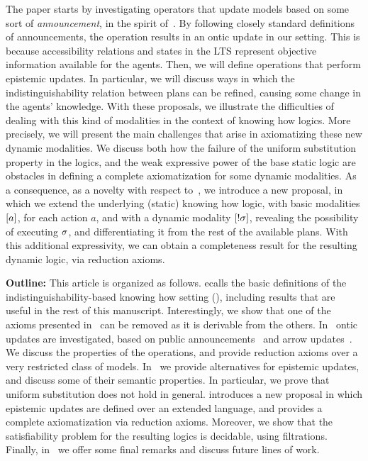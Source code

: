 The paper starts by investigating operators that update models based on some sort of \emph{announcement}, in the spirit of~\cite{Plaza89:lopc}. By following closely standard definitions of announcements, the operation results in an ontic update in our setting. This is because accessibility relations and states in the LTS represent objective information available for the agents. Then, we will define operations that perform epistemic updates. In particular, we will discuss ways in which the indistinguishability relation between plans can be refined, causing some change in the agents' knowledge. With these proposals, we illustrate the difficulties of dealing with this kind of modalities in the context of knowing how logics. More precisely, we will present the main challenges that arise in axiomatizing these new dynamic modalities. We discuss both how the failure of the uniform substitution property in the logics, and the weak expressive power of the base static logic are obstacles in defining a complete axiomatization for some dynamic modalities. As a consequence, as a novelty with respect to~\cite{AFSV22}, we introduce a new proposal, in which we extend the underlying (static) knowing how logic, with basic modalities $[a]$, for each action $a$, and with a dynamic modality $[!\sigma]$, revealing the possibility of executing $\sigma$, and differentiating it from the rest of the available plans. With this additional expressivity, we can obtain a completeness result for the resulting dynamic logic, via reduction axioms.

\smallskip

\noindent\textbf{Outline:} This article is organized as follows.  ecalls the basic definitions of the indistinguishability-based knowing how setting (\cite{AFSVQ21,AFSVQ23report}), including results that are useful in the rest of this manuscript.  Interestingly, we show that one of the axioms presented in~\cite{AFSVQ21,AFSVQ23report} can be removed as it is derivable from the others. In~ ontic updates are investigated, based on public announcements~\cite{Plaza89:lopc} and arrow updates~\cite{KooiR11}. We discuss the properties of the operations, and provide reduction axioms over a very restricted class of models. In~ we provide alternatives for epistemic updates, and discuss some of their semantic properties. In particular, we prove that uniform substitution does not hold in general.  introduces a new proposal in which epistemic updates are defined over an extended language, and provides a complete axiomatization via reduction axioms. Moreover, we show that the satisfiability problem for the resulting logics is decidable, using filtrations. Finally, in~ we offer some final remarks and discuss future lines of work.
